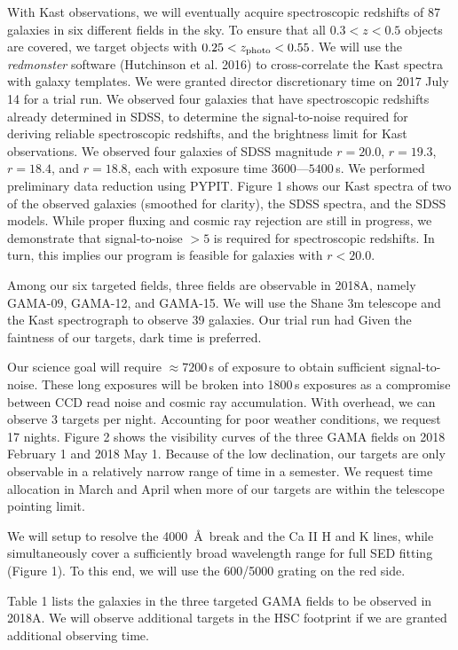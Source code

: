 \documentclass[letterpaper,12pt]{article}
\begin{document}
With Kast observations, we will eventually acquire spectroscopic redshifts of 87 galaxies in six different fields in
the sky. To ensure that all $0.3 < z < 0.5$ objects are covered, we target objects with $0.25<z_{\rm photo}<0.55$. We
will use the {\it redmonster} software (Hutchinson et al. 2016) to cross-correlate the Kast spectra with galaxy
templates. We were granted director discretionary time on 2017 July 14 for a trial run. We observed four galaxies that
have spectroscopic redshifts already determined in SDSS, to determine the signal-to-noise required for deriving
reliable spectroscopic redshifts, and the brightness limit for Kast observations. We observed four galaxies of SDSS
magnitude $r=20.0$, $r=19.3$, $r=18.4$, and $r=18.8$, each with exposure time $3600\textrm{---}5400$\,s. We performed
preliminary data reduction using PYPIT. Figure 1 shows our Kast spectra of two of the observed galaxies (smoothed for
clarity), the SDSS spectra, and the SDSS models. While proper fluxing and cosmic ray rejection are still in progress,
we demonstrate that signal-to-noise $>5$ is required for spectroscopic redshifts. In turn, this implies our program is
feasible for galaxies with $r<20.0$.

Among our six targeted fields, three fields are observable in 2018A, namely GAMA-09, GAMA-12, and GAMA-15. We will use
the Shane 3m telescope and the Kast spectrograph to observe 39 galaxies. Our trial run had Given the faintness of our targets, dark time
is preferred.

Our science goal will require $\approx7200$\,s of exposure to obtain sufficient signal-to-noise. These long exposures
will be broken into 1800\,s exposures as a compromise between CCD read noise and cosmic ray accumulation. With
overhead, we can observe 3 targets per night. Accounting for poor weather conditions, we request 17 nights. Figure
2 shows the visibility curves of the three GAMA fields on 2018 February 1 and 2018 May 1. Because of the low
declination, our targets are only observable in a relatively narrow range of time in a semester. We request time
allocation in March and April when more of our targets are within the telescope pointing limit.

We will setup to resolve the 4000~\AA\ break and the Ca II H and K lines, while simultaneously cover a sufficiently
broad wavelength range for full SED fitting (Figure 1). To this end, we will use the 600/5000 grating on the red side.

Table 1 lists the galaxies in the three targeted GAMA fields to be observed in 2018A. We will observe additional
targets in the HSC footprint if we are granted additional observing time.
\end{document}
